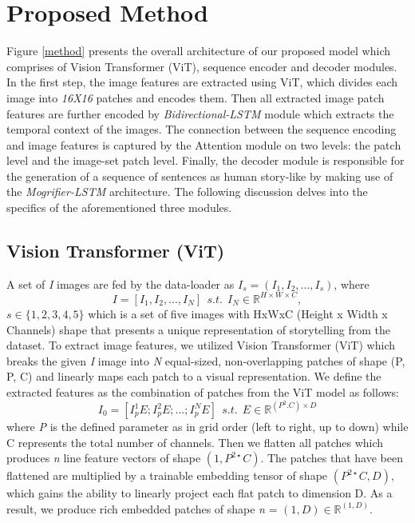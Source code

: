 \documentclass[runningheads]{llncs}
\begin{document}
\section{Proposed Method}
Figure \ref{method} presents the overall architecture of our proposed model which comprises of Vision Transformer (ViT), sequence encoder and decoder modules. In the first step, the image features are extracted using ViT, which divides each image into {\em16X16} patches and encodes them. Then all extracted image patch features are further encoded by {\em Bidirectional-LSTM} module which extracts the temporal context of the images. The connection between the sequence encoding and image features is captured by the Attention module on two levels: the patch level and the image-set patch level. Finally, the decoder module is responsible for the generation of a sequence of sentences as human story-like by making use of the {\em Mogrifier-LSTM} architecture. The following discussion delves into the specifics of the aforementioned three modules.



\subsection{Vision Transformer (ViT)}
A set of {\em I} images are fed by the data-loader as $I_s = (I_1, I_2, ..., I_s)$, where
\begin{equation}
 I = [ I_1, I_2, ..., I_N]~~s.t.~~ I_N \in
  \mathbb{R}^{H\times W \times C},
\end{equation}
$s \in \{1, 2, 3, 4, 5\}$ which is a set of five images with HxWxC (Height x Width x Channels) shape that presents a unique representation of storytelling from the dataset. To extract image features, we utilized Vision Transformer (ViT) \cite{dosovitskiy2020image} which breaks the given {\em I} image into {\em N} equal-sized, non-overlapping patches of shape (P, P, C) and linearly maps each patch to a visual representation. We define the extracted features as the combination of patches from the ViT model as follows:
\begin{equation}
 I_0 = [ I_p^1E; I_p^2E; ...; I_p^NE]~~s.t.~~ E \in
  \mathbb{R}^{(P^2.C) \times D}
\end{equation}
where {\em P} is the defined parameter as in grid order (left to right, up to down) while C represents the total number of channels. Then we flatten all patches which produces {\em n} line feature vectors of shape $(1, P^{2\star} C)$.
The patches that have been flattened are multiplied by a trainable embedding tensor of shape $(P^{2\star} C, D)$, which gains the ability to linearly project each flat patch to dimension D. As a result, we produce rich embedded patches of shape {\em n} = $ (1, D)\in \mathbb{R}^{(1, D)}$.
\end{document}
